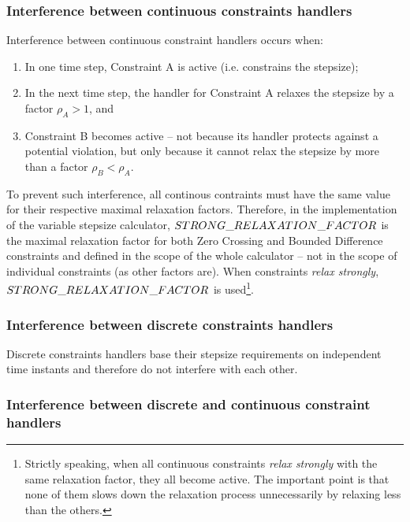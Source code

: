 \subsubsection{Interference between continuous constraints handlers}\label{sec:interferencecc}

Interference between continuous constraint handlers occurs when:
\begin{enumerate}
\item In one time step, Constraint A is active (i.e. constrains the stepsize);
\item	In the next time step, the handler for Constraint A relaxes the stepsize by a factor $\rho_A > 1$, and
\item Constraint B becomes active -- not because its handler protects against a potential violation, but only because it cannot relax the stepsize by more than a factor $\rho_B < \rho_A$.
\end{enumerate}
	
\noindent To prevent such interference, all continous contraints must have the same value for their respective maximal relaxation factors. Therefore, in the implementation of the variable stepsize calculator, $STRONG\_\-RE\-LA\-XA\-TION\_\-FACTOR$ is the maximal relaxation factor for both Zero Crossing and Bounded Difference constraints and defined in the scope of the whole calculator -- not in the scope of individual constraints (as other factors are). When constraints \textit{relax strongly}, $STRONG\_\-RELAXATION\_\-FACTOR$ is used\footnote{Strictly speaking, when all continuous constraints \textit{relax strongly} with the same relaxation factor, they all become active. The important point is that none of them slows down the relaxation process unnecessarily by relaxing less than the others.}.


\subsubsection{Interference between discrete constraints handlers}

Discrete constraints handlers base their stepsize requirements on independent time instants and therefore do not interfere with each other.

\subsubsection{Interference between discrete and continuous constraint handlers}\label{sec:interferencedc}

